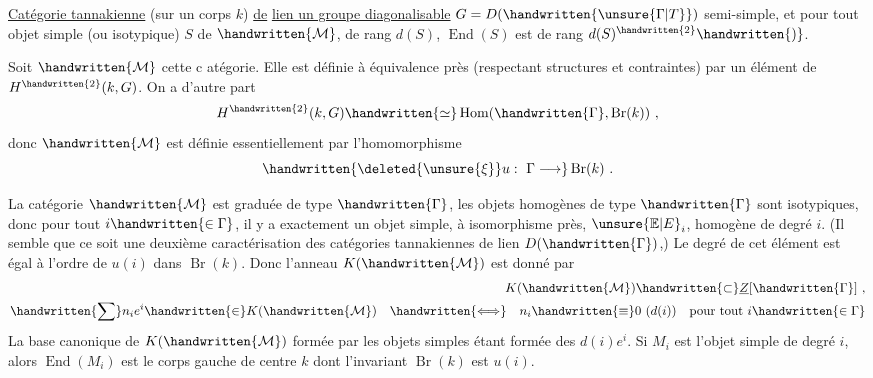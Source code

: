 \uline{Catégorie tannakienne} (sur un corps $k$) \uline{de}  \uline{lien un groupe diagonalisable} $G=D(\handwritten{\unsure{\Gamma|T}})$  semi-simple, et pour tout objet simple (ou isotypique) $S$ de $\handwritten{\mathcal{M}}$, de rang $d(S)$, $\operatorname{End}(S)$ est de rang $d(S)^{\handwritten{2}}\handwritten{)}$.

Soit $\handwritten{\mathcal{M}}$ cette c atégorie. Elle est définie à équivalence près (respectant structures et contraintes) par un élément\inserted{\handwritten{$\xi$}} de $H^{\handwritten{2}}(k,G)$. On a d'autre part
\[
H^{\handwritten{2}}(k,G)\handwritten{\simeq}\operatorname{Hom}(\handwritten{\Gamma},\operatorname{Br}(k))\ ,
\]
donc $\handwritten{\mathcal{M}}$ est définie essentiellement par l'homomorphisme 
\[
\handwritten{\deleted{\unsure{\xi}}u:\ \Gamma\longrightarrow}\operatorname{Br}(k)\ .
\]

 La catégorie $\handwritten{\mathcal{M}}$ est graduée de type $\handwritten{\Gamma}$, les objets homogènes de type $\handwritten{\Gamma}$ sont isotypiques, donc pour tout $i\handwritten{\in\Gamma}$, il y a exactement un objet simple, à isomorphisme près, $\unsure{\mathbb{E}|E}_i$,  homogène de degré $i$. (Il semble que ce soit une deuxième caractérisation des catégories tannakiennes de lien $D(\handwritten{\Gamma})$,) Le degré de cet élément est égal à l'ordre de $u(i)$ dans $\operatorname{Br}(k)$. Donc l'anneau $K(\handwritten{\mathcal{M}})$ est donné par
\[
\begin{aligned}
K(\handwritten{\mathcal{M}})\handwritten{\subset}\underline{Z}[\handwritten{\Gamma}]\ ,\\
\handwritten{\sum}n_i e^i\handwritten{\in}K(\handwritten{\mathcal{M}})\quad\handwritten{\Longleftrightarrow}\quad n_i\handwritten{\equiv}0\ (d(i))\quad\text{pour tout }i\handwritten{\in\Gamma}
\end{aligned}
\]
La base canonique de $K(\handwritten{\mathcal{M}})$ formée par les objets simples étant formée des $d(i)e^i$. Si $M_i$ est l'objet simple de  degré $i$, alors $\operatorname{End}(M_i)$ est le corps gauche  de centre $k$ dont l'invariant  $\operatorname{Br}(k)$ est $u(i)$.

